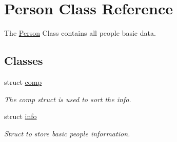 \hypertarget{class_person}{\section{Person Class Reference}
\label{class_person}
}


The \hyperlink{class_person}{Person} Class contains all people basic data.  


\subsection*{Classes}
\begin{DoxyCompactItemize}
\item 
struct \hyperlink{struct_person_1_1comp}{comp}
\begin{DoxyCompactList}\small\item\em The comp struct is used to sort the info. \end{DoxyCompactList}\item 
struct \hyperlink{struct_person_1_1info}{info}
\begin{DoxyCompactList}\small\item\em Struct to store basic people information. \end{DoxyCompactList}\end{DoxyCompactItemize}
